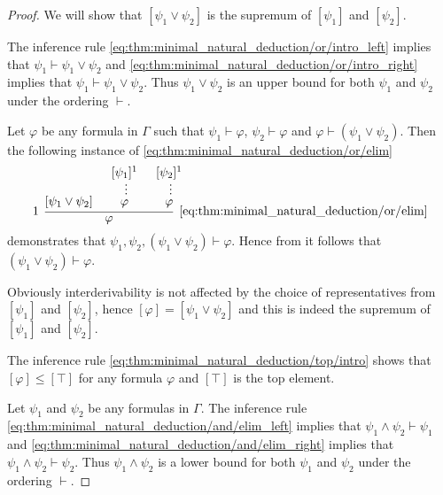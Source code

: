 \begin{proof}
   We will show that \( [\psi_1 \vee \psi_2] \) is the supremum of \( [\psi_1] \) and \( [\psi_2] \).

  The inference rule \eqref{eq:thm:minimal_natural_deduction/or/intro_left} implies that \( \psi_1 \vdash \psi_1 \vee \psi_2 \) and \eqref{eq:thm:minimal_natural_deduction/or/intro_right} implies that \( \psi_1 \vdash \psi_1 \vee \psi_2 \). Thus \( \psi_1 \vee \psi_2 \) is an upper bound for both \( \psi_1 \) and \( \psi_2 \) under the ordering \( \vdash \).

  Let \( \varphi \) be any formula in \( \Gamma \) such that \( \psi_1 \vdash \varphi \), \( \psi_2 \vdash \varphi \) and \( \varphi \vdash (\psi_1 \vee \psi_2) \). Then the following instance of \eqref{eq:thm:minimal_natural_deduction/or/elim}
  \begin{equation*}
    \begin{prooftree}
      \hypo{ [\psi_1 \vee \psi_2] }
      \hypo{ [\psi_1]^1 }
      \ellipsis {} { \varphi }
      \hypo{ [\psi_2]^1 }
      \ellipsis {} { \varphi }
      \infer[left label=\( 1 \)]3[\ref{eq:thm:minimal_natural_deduction/or/elim}]{ \varphi }
    \end{prooftree}
  \end{equation*}
  demonstrates that \( \psi_1, \psi_2, (\psi_1 \vee \psi_2) \vdash \varphi \). Hence from  it follows that \( (\psi_1 \vee \psi_2) \vdash \varphi \).

  Obviously interderivability is not affected by the choice of representatives from \( [\psi_1] \) and \( [\psi_2] \), hence \( [\varphi] = [\psi_1 \vee \psi_2] \) and this is indeed the supremum of \( [\psi_1] \) and \( [\psi_2] \).

   The inference rule \eqref{eq:thm:minimal_natural_deduction/top/intro} shows that \( [\varphi] \leq [\top] \) for any formula \( \varphi \) and \( [\top] \) is the top element.

   Let \( \psi_1 \) and \( \psi_2 \) be any formulas in \( \Gamma \). The inference rule \eqref{eq:thm:minimal_natural_deduction/and/elim_left} implies that \( \psi_1 \wedge \psi_2 \vdash \psi_1 \) and \eqref{eq:thm:minimal_natural_deduction/and/elim_right} implies that \( \psi_1 \wedge \psi_2 \vdash \psi_2 \). Thus \( \psi_1 \wedge \psi_2 \) is a lower bound for both \( \psi_1 \) and \( \psi_2 \) under the ordering \( \vdash \).


\end{proof}
